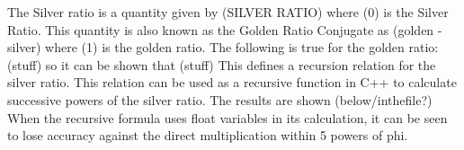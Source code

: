 The Silver ratio is a quantity given by (SILVER RATIO) where (0) is the Silver Ratio.
This quantity is also known as the Golden Ratio Conjugate as (golden - silver) where (1)
is the golden ratio.
The following is true for the golden ratio:(stuff)
so it can be shown that (stuff)
This defines a recursion relation for the silver ratio. This relation can be used as a
recursive function in C++ to calculate successive powers of the silver ratio.
The results are shown (below/inthefile?)
When the recursive formula uses float variables in its calculation, it can be seen to lose
accuracy against the direct multiplication within 5 powers of phi.